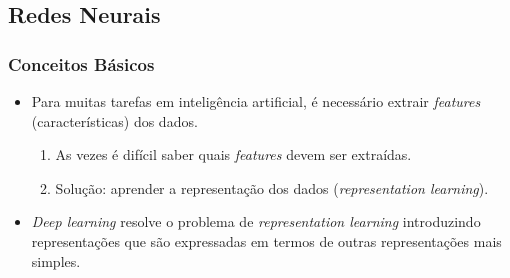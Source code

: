 \documentclass{beamer}
\begin{document}
\subsection{Redes Neurais}
\begin{frame}
\frametitle{Conceitos Básicos}
\begin{itemize}
\item Para muitas tarefas em inteligência artificial, é necessário extrair \textit{features} (características) dos dados.
\begin{enumerate}
\item As vezes é difícil saber quais \textit{features} devem ser extraídas.
\item Solução: aprender a representação dos dados (\textit{representation learning}).
\end{enumerate}
\item \textit{Deep learning} resolve o problema de \textit{representation learning} introduzindo representações que são expressadas em termos de outras representações mais simples.
\end{itemize} 
\end{frame}
\end{document}
